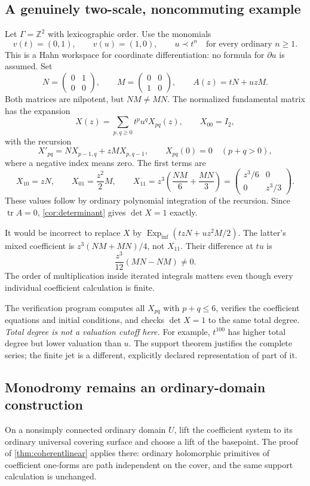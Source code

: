 \documentclass[11pt,letterpaper]{article}
\numberwithin{equation}{section}
\theoremstyle{definition}
\theoremstyle{remark}
\newcommand{\Z}{\mathbb Z}
\newcommand{\D}{\partial}
\newcommand{\Einf}{\operatorname{Exp}_{\mathrm{inf}}}
\newcommand{\tr}{\operatorname{tr}}
\begin{document}
\subsection{A genuinely two-scale, noncommuting example}
Let $\Gamma=\Z^2$ with lexicographic order. Use the monomials
\[
 v(t)=(0,1),\qquad v(u)=(1,0),\qquad u\prec t^n
 \quad\text{for every ordinary }n\ge1.
\]
This is a Hahn workspace for coordinate differentiation: no formula for
$\D u$ is assumed. Set
\[
 N=\begin{pmatrix}0&1\\0&0\end{pmatrix},\qquad
 M=\begin{pmatrix}0&0\\1&0\end{pmatrix},\qquad
 A(z)=tN+uzM.
\]
Both matrices are nilpotent, but $NM\ne MN$. The normalized fundamental
matrix has the expansion
\[
 X(z)=\sum_{p,q\ge0}t^pu^qX_{pq}(z),\qquad X_{00}=I_2,
\]
with the recursion
\begin{equation}\label{eq:twoscale}
 X'_{pq}=N X_{p-1,q}+zM X_{p,q-1},\qquad
 X_{pq}(0)=0\quad(p+q>0),
\end{equation}
where a negative index means zero. The first terms are
\[
 X_{10}=zN,\qquad X_{01}=\frac{z^2}{2}M,
 \qquad
 X_{11}=z^3\left(\frac{NM}{6}+\frac{MN}{3}\right)
       =\begin{pmatrix}z^3/6&0\\0&z^3/3\end{pmatrix}.
\]
These values follow by ordinary polynomial integration of the recursion.
Since $\tr A=0$, \cref{cor:determinant} gives $\det X=1$ exactly.

It would be incorrect to replace $X$ by
$\Einf(tzN+uz^2M/2)$. The latter's mixed coefficient is
$z^3(NM+MN)/4$, not $X_{11}$. Their difference at $tu$ is
\[
 \frac{z^3}{12}(MN-NM)\ne0.
\]
The order of multiplication inside iterated integrals matters even though
every individual coefficient calculation is finite.

The verification program computes all $X_{pq}$ with $p+q\le6$, verifies the
coefficient equations and initial conditions, and checks $\det X=1$ to the
same total degree. \emph{Total degree is not a valuation cutoff here.}
For example, $t^{100}$ has higher total degree but lower valuation than $u$.
The support theorem justifies the complete series; the finite jet is a
different, explicitly declared representation of part of it.

\subsection{Monodromy remains an ordinary-domain construction}
On a nonsimply connected ordinary domain $U$, lift the coefficient system
to its ordinary universal covering surface and choose a lift of the
basepoint. The proof of \cref{thm:coherentlinear} applies there: ordinary
holomorphic primitives of coefficient one-forms are path independent on
the cover, and the same support calculation is unchanged.
\end{document}
